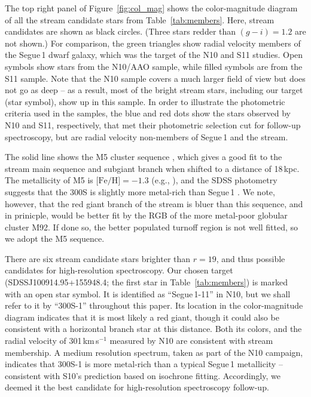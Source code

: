 \documentclass{emulateapj}
\begin{document}
The top right panel of Figure~\ref{fig:col_mag} shows the
color-magnitude diagram of all the stream candidate stars from
Table~\ref{tab:members}. Here, stream candidates are shown as black
circles. (Three stars redder than $(g-i) = 1.2 $ are not shown.) For
comparison, the green triangles show radial velocity members of the
Segue\,1 dwarf galaxy, which was the target of the N10 and S11
studies. Open symbols show stars from the N10/AAO sample, while filled
symbols are from the S11 sample. Note that the N10 sample covers a
much larger field of view but does not go as deep -- as a result, most
of the bright stream stars, including our target (star symbol), show
up in this sample. In order to illustrate the photometric criteria
used in the samples, the blue and red dots show the stars observed by
N10 and S11, respectively, that met their photometric selection cut
for follow-up spectroscopy, but are radial velocity non-members of
Segue\,1 and the stream.

The solid line shows the M5 cluster sequence \citep{An2008}, which
gives a good fit to the stream main sequence and subgiant branch when
shifted to a distance of 18\,kpc. The metallicity of M5 is
$\mbox{[Fe/H]} = -1.3$ (e.g., \citealt{Carretta2009}), and the SDSS
photometry suggests that the 300S is slightly more metal-rich than
Segue\,1 \citep{Simon2011}. We note, however, that the red giant
branch of the stream is bluer than this sequence, and in prinicple,
would be better fit by the RGB of the more metal-poor globular cluster
M92. If done so, the better populated turnoff region is not well
fitted, so we adopt the M5 sequence.

There are six stream candidate stars brighter than $r = 19$, and thus
possible candidates for high-resolution spectroscopy. Our chosen
target (SDSSJ100914.95+155948.4; the first star in
Table~\ref{tab:members}) is marked with an open star symbol. It is
identified as ``Segue\,1-11'' in N10, but we shall refer to it by
``300S-1'' throughout this paper. Its location in the color-magnitude
diagram indicates that it is most likely a red giant, though it could
also be consistent with a horizontal branch star at this distance. Both its
colors, and the radial velocity of 301\,km\,s$^{-1}$ measured by N10
are consistent with stream membership.  A medium resolution spectrum,
taken as part of the N10 campaign, indicates that 300S-1 is more
metal-rich than a typical Segue\,1 metallicity -- consistent with
S10's prediction based on isochrone fitting.  Accordingly, we deemed
it the best candidate for high-resolution spectroscopy follow-up.
\end{document}

